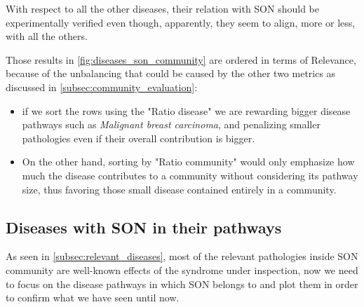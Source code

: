 With respect to all the other diseases, their relation with SON should be experimentally verified even though, apparently, they seem to align, more or less, with all the others.
\vspace{3mm}

Those results in \autoref{fig:diseases_son_community} are ordered in terms of Relevance, because of the unbalancing that could be caused by the other two metrics as discussed in \autoref{subsec:community_evaluation}: 
\begin{itemize}
    \item if we sort the rows using the "Ratio disease" we are rewarding bigger disease pathways such as \textit{Malignant breast carcinoma}, and penalizing smaller pathologies even if their overall contribution is bigger.
    \item On the other hand, sorting by "Ratio community" would only emphasize how much the disease contributes to a community without considering its pathway size, thus favoring those small disease contained entirely in a community.
\end{itemize}
 
\subsection{Diseases with SON in their pathways}\label{subsec:diseases_son}
As seen in \autoref{subsec:relevant_diseases}, most of the relevant pathologies inside SON community are well-known effects of the syndrome under inspection, now we need to focus on the disease pathways in which SON belongs to and plot them in order to confirm what we have seen until now.
\vspace{3mm}

